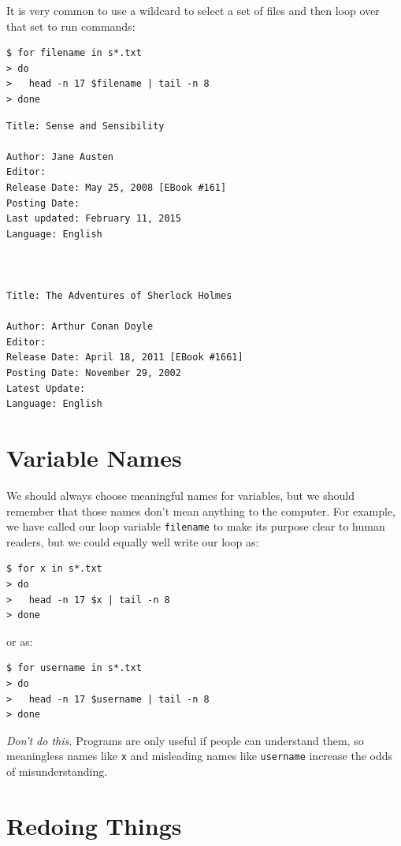 \documentclass[
]{krantz}
\begin{document}
It is very common to use a wildcard to select a set of files
and then loop over that set to run commands:

\begin{verbatim}
$ for filename in s*.txt
> do
>   head -n 17 $filename | tail -n 8
> done
\end{verbatim}

\begin{verbatim}
Title: Sense and Sensibility

Author: Jane Austen
Editor:
Release Date: May 25, 2008 [EBook #161]
Posting Date:
Last updated: February 11, 2015
Language: English



Title: The Adventures of Sherlock Holmes

Author: Arthur Conan Doyle
Editor:
Release Date: April 18, 2011 [EBook #1661]
Posting Date: November 29, 2002
Latest Update:
Language: English
\end{verbatim}

\hypertarget{bash-basics-meaningless}{%
\section{Variable Names}\label{bash-basics-meaningless}}

We should always choose meaningful names for variables,
but we should remember that those names don't mean anything to the computer.
For example,
we have called our loop variable \texttt{filename}
to make its purpose clear to human readers,
but we could equally well write our loop as:

\begin{verbatim}
$ for x in s*.txt
> do
>   head -n 17 $x | tail -n 8
> done
\end{verbatim}

or as:

\begin{verbatim}
$ for username in s*.txt
> do
>   head -n 17 $username | tail -n 8
> done
\end{verbatim}

\emph{Don't do this.}
Programs are only useful if people can understand them,
so meaningless names like \texttt{x} and misleading names like \texttt{username}
increase the odds of misunderstanding.

\hypertarget{bash-basics-history}{%
\section{Redoing Things}\label{bash-basics-history}}
\end{document}
